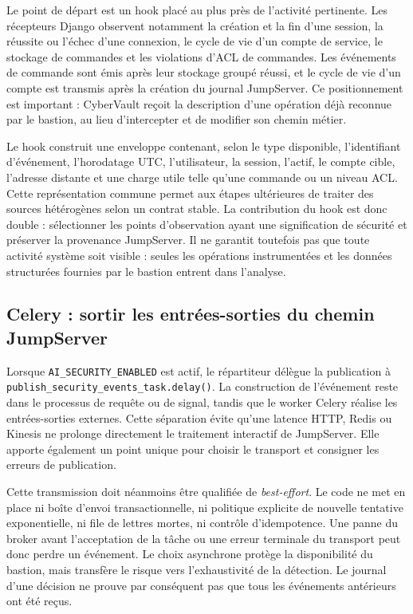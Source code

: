 \documentclass[11pt,a4paper,oneside]{report}
\theoremstyle{definition}
\theoremstyle{plain}
\begin{document}
Le point de départ est un hook placé au plus près de l'activité pertinente.
Les récepteurs Django observent notamment la création et la fin d'une session,
la réussite ou l'échec d'une connexion, le cycle de vie d'un compte de service,
le stockage de commandes et les violations d'ACL de commandes. Les événements
de commande sont émis après leur stockage groupé réussi, et le cycle de vie
d'un compte est transmis après la création du journal JumpServer. Ce
positionnement est important : CyberVault reçoit la description d'une
opération déjà reconnue par le bastion, au lieu d'intercepter et de modifier
son chemin métier.

Le hook construit une enveloppe contenant, selon le type disponible,
l'identifiant d'événement, l'horodatage UTC, l'utilisateur, la session,
l'actif, le compte cible, l'adresse distante et une charge utile telle qu'une
commande ou un niveau ACL. Cette représentation commune permet aux étapes
ultérieures de traiter des sources hétérogènes selon un contrat stable. La
contribution du hook est donc double : sélectionner les points d'observation
ayant une signification de sécurité et préserver la provenance JumpServer.
Il ne garantit toutefois pas que toute activité système soit visible : seules
les opérations instrumentées et les données structurées fournies par le
bastion entrent dans l'analyse.

\subsection{Celery : sortir les entrées-sorties du chemin JumpServer}

Lorsque \texttt{AI\_SECURITY\_ENABLED} est actif, le répartiteur délègue la
publication à \texttt{publish\_security\_events\_task.delay()}. La construction
de l'événement reste dans le processus de requête ou de signal, tandis que le
worker Celery réalise les entrées-sorties externes. Cette séparation évite
qu'une latence HTTP, Redis ou Kinesis ne prolonge directement le traitement
interactif de JumpServer. Elle apporte également un point unique pour choisir
le transport et consigner les erreurs de publication.

Cette transmission doit néanmoins être qualifiée de \emph{best-effort}. Le
code ne met en place ni boîte d'envoi transactionnelle, ni politique explicite
de nouvelle tentative exponentielle, ni file de lettres mortes, ni contrôle
d'idempotence. Une panne du broker avant l'acceptation de la tâche ou une
erreur terminale du transport peut donc perdre un événement. Le choix
asynchrone protège la disponibilité du bastion, mais transfère le risque vers
l'exhaustivité de la détection. Le journal d'une décision ne prouve par
conséquent pas que tous les événements antérieurs ont été reçus.
\end{document}
